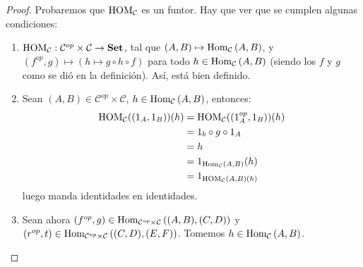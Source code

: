 \documentclass[12pt]{report}
\newcounter{it}
\theoremstyle{largebreak}
\newcommand\cf[3]{\ensuremath{#1:#2\rightarrow#3}}
\newcommand{\Hom}[3]{\ensuremath{\textup{Hom}_{#1}\left(#2,#3\right)}}
\newcommand{\Cat}[1]{\ensuremath{\textup{\textbf{#1}}}}
\begin{document}
    \begin{proof}
        Probaremos que $\textup{HOM}_{\mathcal{C}}$ es un funtor. Hay que ver que se cumplen algunas condiciones:
        \begin{enumerate}
            \item $\cf{\HOM{\mathcal{C}}}{\mathcal{C}^{op}\times\mathcal{C}}{\Cat{Set}}$, tal que $(A,B)\mapsto\Hom{\mathcal{C}}{A}{B}$, y $(f^{op},g)\mapsto (h\mapsto g\circ h\circ f)$ para todo $h\in\Hom{\mathcal{C}}{A}{B}$ (siendo los $f$ y $g$ como se dió en la definición). Así, está bien definido.
            \item Sean $(A,B)\in\mathcal{C}^{op}\times\mathcal{C}$, $h\in\Hom{\mathcal{C}}{A}{B}$, entonces:
            \begin{equation*}
                \begin{split}
                    \HOM{\mathcal{C}}((1_A,1_B))(h)&=\HOM{\mathcal{C}}((1^{op}_A,1_B))(h)\\
                    &=1_b\circ g\circ 1_A\\
                    &=h\\
                    &=1_{ \Hom{\mathcal{C}}{A}{B}}(h)\\
                    &=1_{\HOM{\mathcal{C}}(A,B)(h)}
                \end{split}
            \end{equation*}
            luego manda identidades en identidades.
            \item Sean ahora $(f^{op},g)\in\Hom{\mathcal{C}^{op}\times\mathcal{C}}{(A,B)}{(C,D)}$ y $(r^{op},t)\in\Hom{\mathcal{C}^{op}\times\mathcal{C}}{(C,D)}{(E,F)}$. Tomemos $h\in\Hom{\mathcal{C}}{A}{B}$.
            

\end{enumerate}
\end{proof}
\end{document}
